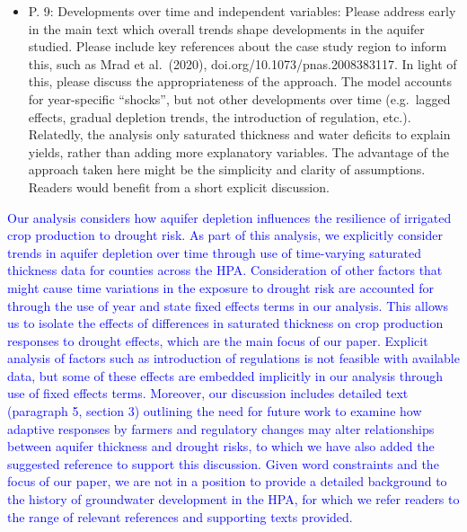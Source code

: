 \documentclass[
]{article}
\providecommand{\tightlist}{%
  \setlength{\itemsep}{0pt}\setlength{\parskip}{0pt}}
\begin{document}
\begin{itemize}
\tightlist
\item
  P. 9: Developments over time and independent variables: Please address
  early in the main text which overall trends shape developments in the
  aquifer studied. Please include key references about the case study
  region to inform this, such as Mrad et al.~(2020),
  doi.org/10.1073/pnas.2008383117. In light of this, please discuss the
  appropriateness of the approach. The model accounts for year-specific
  ``shocks'', but not other developments over time (e.g.~lagged effects,
  gradual depletion trends, the introduction of regulation, etc.).
  Relatedly, the analysis only saturated thickness and water deficits to
  explain yields, rather than adding more explanatory variables. The
  advantage of the approach taken here might be the simplicity and
  clarity of assumptions. Readers would benefit from a short explicit
  discussion.
\end{itemize}

\textcolor{blue}{Our analysis considers how aquifer depletion influences the resilience of irrigated crop production to drought risk. As part of this analysis, we explicitly consider trends in aquifer depletion over time through use of time-varying saturated thickness data for counties across the HPA. Consideration of other factors that might cause time variations in the exposure to drought risk are accounted for through the use of year and state fixed effects terms in our analysis. This allows us to isolate the effects of differences in saturated thickness on crop production responses to drought effects, which are the main focus of our paper. Explicit analysis of factors such as introduction of regulations is not feasible with available data, but some of these effects are embedded implicitly in our analysis through use of fixed effects terms. Moreover, our discussion includes detailed text (paragraph 5, section 3) outlining the need for future work to examine how adaptive responses by farmers and regulatory changes may alter relationships between aquifer thickness and drought risks, to which we have also added the suggested reference to support this discussion. Given word constraints and the focus of our paper, we are not in a position to provide a detailed background to the history of groundwater development in the HPA, for which we refer readers to the range of relevant references and supporting texts provided.}
\end{document}
